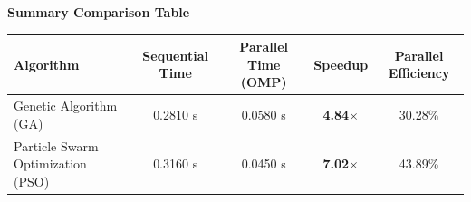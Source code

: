 \documentclass[12pt]{article}
\begin{document}
\vspace{0.3cm}

\textbf{\large Summary Comparison Table}

\begin{table}[H]
\centering
\begin{tabular}{lcccc}
\toprule
\textbf{Algorithm} & \textbf{Sequential Time} & \textbf{Parallel Time (OMP)} & \textbf{Speedup} & \textbf{Parallel Efficiency} \\
\midrule
Genetic Algorithm (GA) & 0.2810 s & 0.0580 s & \textbf{4.84$\times$} & 30.28\% \\
Particle Swarm Optimization (PSO) & 0.3160 s & 0.0450 s & \textbf{7.02$\times$} & 43.89\% \\
\bottomrule
\end{tabular}
\end{table}
\end{document}
